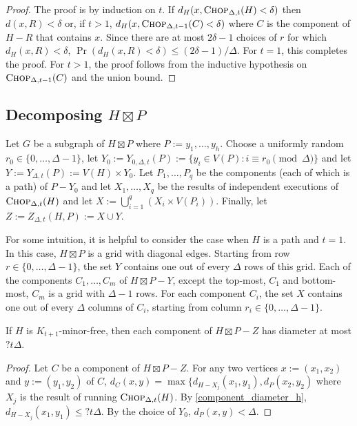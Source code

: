 \documentclass{patmorin}
\begin{document}
\begin{proof}
  The proof is by induction on $t$.
  If $d_H(x,\textsc{Chop}_{\Delta,t}(H) < \delta)$ then $d(x,R)< \delta$ or, if $t>1$,  $d_H(x,\textsc{Chop}_{\Delta,t-1}(C) < \delta)$ where $C$ is the component of $H-R$ that contains $x$.  Since there are at most $2\delta-1$ choices of $r$ for which $d_H(x,R)<\delta$, $\Pr(d_H(x,R)<\delta) \le (2\delta-1)/\Delta$. For $t=1$, this completes the proof.  For $t>1$, the proof follows from the inductive hypothesis on $\textsc{Chop}_{\Delta,t-1}(C)$ and the union bound.
\end{proof}

\subsection{\boldmath Decomposing $H\boxtimes P$}

Let $G$ be a subgraph of $H\boxtimes P$ where $P:=y_1,\ldots,y_h$. Choose a uniformly random $r_0\in\{0,\ldots,\Delta-1\}$, let $Y_0:=Y_{0,\Delta,t}(P):=\{y_i\in V(P):i\equiv r_0\pmod\Delta\}$ and let $Y:=Y_{\Delta,t}(P):=V(H)\times Y_0$.  Let $P_1,\ldots,P_q$ be the components (each of which is a path) of $P-Y_0$ and let $X_1,\ldots,X_q$ be the results of independent executions of $\textsc{Chop}_{\Delta,t}(H)$ and let $X:=\bigcup_{i=1}^q (X_i\times V(P_i))$.  Finally, let $Z:=Z_{\Delta,t}(H,P):=X\cup Y$.

For some intuition, it is helpful to consider the case when $H$ is a path and $t=1$.  In this case, $H\boxtimes P$ is a grid with diagonal edges.  Starting from row $r\in\{0,\ldots,\Delta-1\}$, the set $Y$ contains one out of every $\Delta$ rows of this grid.  Each of the components $C_1,\ldots,C_m$ of $H\boxtimes P-Y$, except the top-most, $C_1$ and bottom-most, $C_m$ is a grid with $\Delta-1$ rows.  For each component $C_i$, the set $X$ contains one out of every $\Delta$ columns of $C_i$, starting from column $r_i\in\{0,\ldots,\Delta-1\}$. 

\begin{lem}\label{component_diameter}
  If $H$ is $K_{t+1}$-minor-free, then each component of $H\boxtimes P-Z$ has diameter at most $?t\Delta$.
\end{lem}

\begin{proof}
  Let $C$ be a component of $H\boxtimes P-Z$.  For any two vertices $x:=(x_1,x_2)$ and $y:=(y_1,y_2)$ of $C$, $d_{C}(x,y) = \max\{d_{H-X_j}(x_1,y_1),d_{P}(x_2,y_2)$ where $X_j$ is the result of running $\textsc{Chop}_{\Delta,t}(H)$. By \cref{component_diameter_h},  $d_{H-X_j}(x_1,y_1)\le ?t\Delta$.  By the choice of $Y_0$, $d_{P}(x,y)<\Delta$.
\end{proof}
\end{document}
